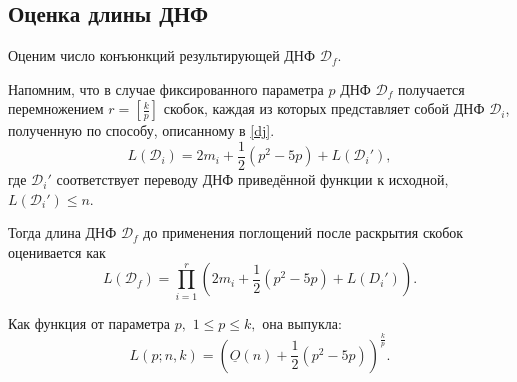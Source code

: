 \documentclass[12pt,a4paper,oneside,fleqn,leqno]{article}
\theoremstyle{definition}
\begin{document}
		\subsection{Оценка длины ДНФ}
			Оценим число конъюнкций результирующей ДНФ $\mathcal{D}_f.$\par
			Напомним, что в случае фиксированного параметра $p$ ДНФ $\mathcal{D}_f$ получается перемножением $r = \left [ \frac{k}{p}\right ]$ скобок, каждая из которых представляет собой ДНФ $\mathcal{D}_i$, полученную по способу, описанному в \ref{dj}. 
			$$L(\mathcal{D}_i) = 2m_i + \frac{1}{2}(p^2 - 5p) + L(\mathcal{D}_i'),$$
			где $\mathcal{D}_i'$ соответствует переводу ДНФ приведённой функции к исходной, $L(\mathcal{D}_i') \leqslant n$.\par
			Тогда длина ДНФ $\mathcal{D}_f$ до применения поглощений после раскрытия скобок оценивается как
			$$
				L(\mathcal{D}_f) = \prod_{i = 1}^{r} \left(2m_i + \frac{1}{2}(p^2 - 5p) + L(D_i') \right).
			$$\par
			Как функция от параметра $p,\,\,1 \leqslant p \leqslant k,$ она выпукла:
			$$
				L(p; n, k) = \left( \underline{O}(n) + \frac{1}{2}(p^2 - 5p)\right)^{\frac{k}{p}}.
			$$
\end{document}
